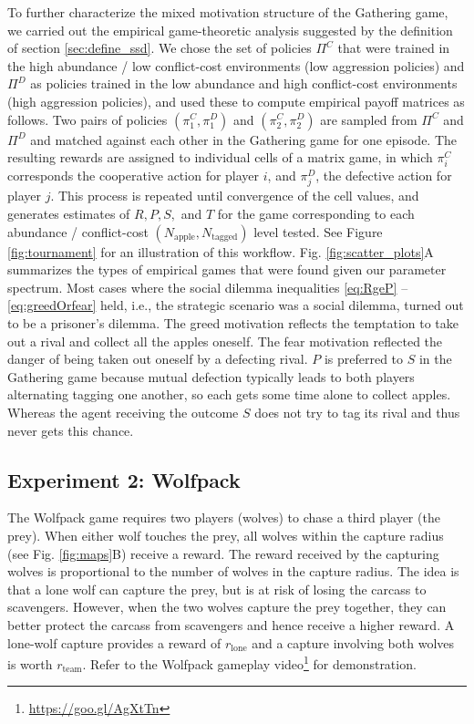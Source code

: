 \documentclass{aamas2017}
\begin{document}
To further characterize the mixed motivation structure of the Gathering game, we carried out the empirical game-theoretic analysis suggested by the definition of section \ref{sec:define_ssd}. We chose the set of policies $\Pi^C$ that were trained in the high abundance / low conflict-cost environments (low aggression policies) and $\Pi^D$ as policies trained in the low abundance and high conflict-cost  environments (high aggression policies), and used these to compute empirical payoff matrices as follows. Two pairs of policies $(\pi_1^C, \pi_1^D)$ and $(\pi_2^C, \pi_2^D)$ are sampled from $\Pi^C$ and $\Pi^D$ and matched against each other in the Gathering game for one episode. The resulting rewards are assigned to individual cells of a matrix game, in which $\pi_i^C$ corresponds the cooperative action for player $i$, and $\pi_j^D$, the defective action for player $j$. This process is repeated until convergence of the cell values, and generates estimates of $R,P,S,$ and $T$ for the game corresponding to each abundance / conflict-cost $(N_{\text{apple}}, N_{\text{tagged}})$ level tested. See Figure \ref{fig:tournament} for an illustration of this workflow. Fig. \ref{fig:scatter_plots}A summarizes the types of empirical games that were found given our parameter spectrum. Most cases where the social dilemma inequalities \eqref{eq:RgeP} -- \eqref{eq:greedOrfear} held, i.e., the strategic scenario was a social dilemma, turned out to be a prisoner's dilemma. The greed motivation reflects the temptation to take out a rival and collect all the apples oneself. The fear motivation reflected the danger of being taken out oneself by a defecting rival. $P$ is preferred to $S$ in the Gathering game because mutual defection typically leads to both players alternating tagging one another, so each gets some time alone to collect apples. Whereas the agent receiving the outcome $S$ does not try to tag its rival and thus never gets this chance.

\subsection{Experiment 2: Wolfpack}\label{sec:wolfpack}
The Wolfpack game requires two players (wolves) to chase a third player (the prey). When either wolf touches the prey, all wolves within the capture radius (see Fig. \ref{fig:maps}B) receive a reward. The reward received by the capturing wolves is proportional to the number of wolves in the capture radius. The idea is that a lone wolf can capture the prey, but is at risk of losing the carcass to scavengers. However, when the two wolves capture the prey together, they can better protect the carcass from scavengers and hence receive a higher reward. A lone-wolf capture provides a reward of $r_{\text{lone}}$ and a capture involving both wolves is worth $r_{\text{team}}$. Refer to the Wolfpack gameplay video\footnote{\href{https://goo.gl/AgXtTn}{https://goo.gl/AgXtTn}} for demonstration.
\end{document}
